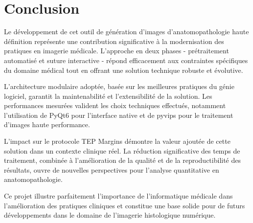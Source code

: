 \documentclass[12pt,a4paper]{report}
\begin{document}
\section{Conclusion}

Le développement de cet outil de génération d'images d'anatomopathologie haute définition représente une contribution significative à la modernisation des pratiques en imagerie médicale. L'approche en deux phases - prétraitement automatisé et suture interactive - répond efficacement aux contraintes spécifiques du domaine médical tout en offrant une solution technique robuste et évolutive.

L'architecture modulaire adoptée, basée sur les meilleures pratiques du génie logiciel, garantit la maintenabilité et l'extensibilité de la solution. Les performances mesurées valident les choix techniques effectués, notamment l'utilisation de PyQt6 pour l'interface native et de pyvips pour le traitement d'images haute performance.

L'impact sur le protocole TEP Margins démontre la valeur ajoutée de cette solution dans un contexte clinique réel. La réduction significative des temps de traitement, combinée à l'amélioration de la qualité et de la reproductibilité des résultats, ouvre de nouvelles perspectives pour l'analyse quantitative en anatomopathologie.

Ce projet illustre parfaitement l'importance de l'informatique médicale dans l'amélioration des pratiques cliniques et constitue une base solide pour de futurs développements dans le domaine de l'imagerie histologique numérique.
\end{document}

